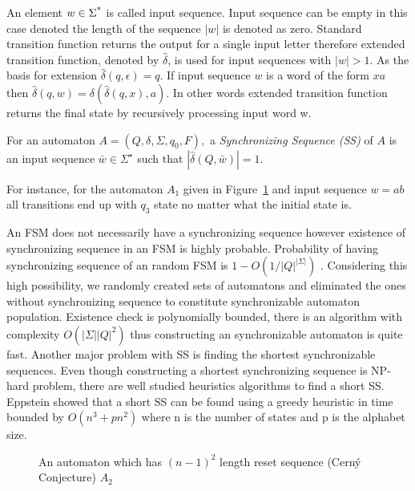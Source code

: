 \documentclass[runningheads]{llncs}
\begin{document}
\par An element $w \in \Sigma \textsuperscript{*}$ is called input sequence. Input sequence can be empty in this case denoted the length of the sequence $|w|$ is denoted as zero. Standard transition function returns the output for a single input letter therefore extended transition function, denoted by $\hat{\delta}$, is used for input sequences with $|w| > 1$. As the basis for extension  $\hat{\delta} (q, \epsilon) = q$. If input sequence $w$ is a word of the form $xa$ then $\hat{\delta} (q, w) = \delta(\hat{\delta}(q, x), a)$. In other words extended transition function returns the final state by recursively processing input word w.

\begin{definition}
For an automaton $A = (Q,\delta, \Sigma, q_{0}, F),$ a {\em Synchronizing Sequence (SS)} of $A$ is an input sequence $\bar{w}\in \Sigma^\star$ such that $|\hat{\delta}(Q,\bar{w})| = 1$.
\end{definition}

For instance, for the automaton $A_{1}$ given in Figure~\ref{fig:A0} and input sequence $w = ab$ all transitions end up with $q_{3}$ state no matter what the initial state is.

\par An FSM does not necessarily have a synchronizing sequence however existence of synchronizing sequence in an FSM is highly probable. Probability of having synchronizing sequence of an random FSM is $1-O(1/|Q|^{|\Sigma|})$
\cite{berlinkov}. Considering this high possibility, we randomly created sets of automatons and eliminated the ones without synchronizing sequence to constitute synchronizable automaton population. Existence check is polynomially bounded, there is an algorithm with complexity $O(|\Sigma||Q|^2)$ \cite{eppstein_1990} thus constructing an synchronizable automaton is quite fast. Another major problem with SS is finding the shortest synchronizable sequences.  Even though constructing a shortest synchronizing sequence is NP-hard problem, there are well studied heuristics algorithms to find a short SS. Eppstein showed that a short SS can be found using a greedy heuristic in time bounded by $O(n^3 + pn^2)$ where n is the number of states and p is the alphabet size\cite{eppstein_1990}.

\begin{figure}[ht]
		\centering
{}
\caption{An automaton which has $(n-1)^2$ length reset sequence (Cerný Conjecture)  $A_2$}\label{fig:A0}
\end{figure}

\newpage


\end{document}
